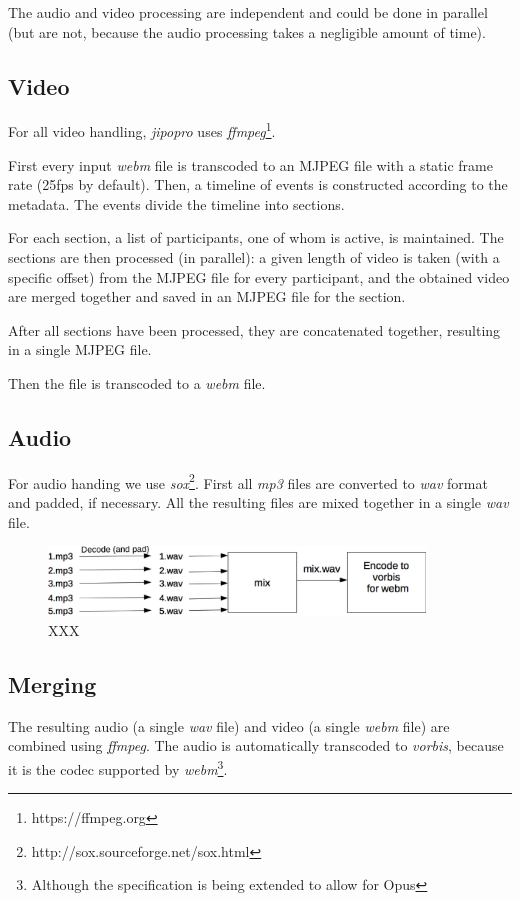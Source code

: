 \documentclass[twoside,openright,a4paper,12pt,english]{article}
\begin{document}
The audio and video processing are independent and could be done in parallel
(but are not, because the audio processing takes a negligible amount of time).


\subsection{Video}
For all video handling, \emph{jipopro} uses \emph{ffmpeg}\footnote{https://ffmpeg.org}.

First every input \emph{webm} file is transcoded to an MJPEG file with a static
frame rate (25fps by default). Then, a timeline of events is constructed
according to the metadata. The events divide the timeline into sections.

For each section, a list of participants, one of whom is active, is maintained.
The sections are then processed (in parallel): a given length of video is taken
(with a specific offset) from the MJPEG file for every participant, and the
obtained video are merged together and saved in an MJPEG file for the section.

After all sections have been processed, they are concatenated together, resulting in
a single MJPEG file.

Then the file is transcoded to a \emph{webm} file.


\subsection{Audio}
For audio handing we use \emph{sox}\footnote{http://sox.sourceforge.net/sox.html}.
First all \emph{mp3} files are converted to \emph{wav} format and padded, if
necessary. All the resulting files are mixed together in a single \emph{wav}
file.

\begin{figure}[h]
    \includegraphics[width=10cm]{./pics/audio-popro.eps}
    \caption{XXX}
\end{figure}


\subsection{Merging}
The resulting audio (a single \emph{wav} file) and video (a single \emph{webm} file)
are combined using \emph{ffmpeg}. The audio is automatically transcoded to \emph{vorbis}, because it is the codec supported by \emph{webm}\footnote{Although the specification is being extended to allow for Opus}.
\end{document}

